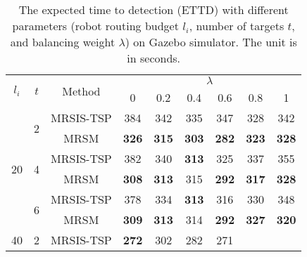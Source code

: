 \begin{table}[]
\centering
\caption{The expected time to detection (ETTD) with different parameters (robot routing budget $l_i$, number of targets $t$, and balancing weight $\lambda$) on Gazebo simulator. The unit is in seconds.}
\label{tab:ETTD-lambda}
\begin{tabular}{|c|c|c|cccccc|}
\hline
\multirow{2}{*}{$l_i$} &
  \multirow{2}{*}{$t$} &
  \multirow{2}{*}{Method} &
  \multicolumn{6}{c|}{$\lambda$} \\ \cline{4-9}
 &
   &
   &
  \multicolumn{1}{c|}{0} &
  \multicolumn{1}{c|}{0.2} &
  \multicolumn{1}{c|}{0.4} &
  \multicolumn{1}{c|}{0.6} &
  \multicolumn{1}{c|}{0.8} &
  1 \\ \hline\hline
\multirow{6}{*}{20} &
  \multirow{2}{*}{2} &
  MRSIS-TSP\cite{li2024mrsis} &
  \multicolumn{1}{c|}{384} &
  \multicolumn{1}{c|}{342} &
  \multicolumn{1}{c|}{335} &
  \multicolumn{1}{c|}{347} &
  \multicolumn{1}{c|}{328} &
  342 \\ \cline{3-9}
 &
   &
  MRSM &
  \multicolumn{1}{c|}{\textbf{326}} &
  \multicolumn{1}{c|}{\textbf{315}} &
  \multicolumn{1}{c|}{\textbf{303}} &
  \multicolumn{1}{c|}{\textbf{282}} &
  \multicolumn{1}{c|}{\textbf{323}} &
  \textbf{328} \\ \cline{2-9}
 &
  \multirow{2}{*}{4} &
  MRSIS-TSP\cite{li2024mrsis} &
  \multicolumn{1}{c|}{382} &
  \multicolumn{1}{c|}{340} &
  \multicolumn{1}{c|}{\textbf{313}} &
  \multicolumn{1}{c|}{325} &
  \multicolumn{1}{c|}{337} &
  355 \\ \cline{3-9}
 &
   &
  MRSM &
  \multicolumn{1}{c|}{\textbf{308}} &
  \multicolumn{1}{c|}{\textbf{313}} &
  \multicolumn{1}{c|}{315} &
  \multicolumn{1}{c|}{\textbf{292}} &
  \multicolumn{1}{c|}{\textbf{317}} &
  \textbf{328} \\ \cline{2-9}
 &
  \multirow{2}{*}{6} &
  MRSIS-TSP\cite{li2024mrsis} &
  \multicolumn{1}{c|}{378} &
  \multicolumn{1}{c|}{334} &
  \multicolumn{1}{c|}{\textbf{313}} &
  \multicolumn{1}{c|}{316} &
  \multicolumn{1}{c|}{330} &
  348 \\ \cline{3-9}
 &
   &
  MRSM &
  \multicolumn{1}{c|}{\textbf{309}} &
  \multicolumn{1}{c|}{\textbf{313}} &
  \multicolumn{1}{c|}{314} &
  \multicolumn{1}{c|}{\textbf{292}} &
  \multicolumn{1}{c|}{\textbf{327}} &
  \textbf{320} \\ \hline\hline
\multirow{6}{*}{40} &
  \multirow{2}{*}{2} &
  MRSIS-TSP\cite{li2024mrsis} &
  \multicolumn{1}{c|}{\textbf{272}} &
  \multicolumn{1}{c|}{302} &
  \multicolumn{1}{c|}{282} &
  \multicolumn{1}{c|}{271} &

\end{tabular}
\end{table}
